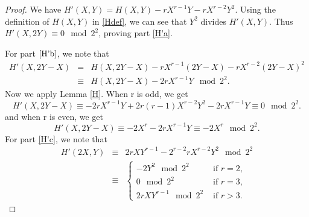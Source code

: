 \documentclass[11pt, reqno]{amsart}
\numberwithin{equation}{section}
\theoremstyle{definition}
\theoremstyle{remark}
\theoremstyle{definition}
\theoremstyle{remark}
\theoremstyle{remark}
\begin{document}
\begin{proof}
We have $H'(X,Y)= H(X,Y) -rX^{r-1}Y -rX^{r-2}Y^{2}$. 
 Using the definition of $H(X,Y)$ in \eqref{Hdef}, we can see that $Y^2$ divides $H'(X,Y)$. Thus $H'(X,2Y) \equiv 0\mod 2^2$, proving part \ref{H'a}.
 
  For part $\ref{H'b}$, we note that 
  \begin{eqnarray*}
   H'(X,2Y-X) &=& H(X,2Y-X)- rX^{r-1}(2Y-X) - rX^{r-2}(2Y-X)^{2}\\
   &\equiv & H(X,2Y-X) -2rX^{r-1}Y \mod 2^2.
 \end{eqnarray*} 
Now we apply Lemma \ref{H}. When r is odd, we get
 \begin{equation*}
   H'(X,2Y-X) \equiv  -2rX^{r-1}Y + 2r(r-1)X^{r-2}Y^{2}-2rX^{r-1}Y \equiv 0 \mod 2^{2}.
   \end{equation*}
   and when r is even, we get
   \begin{equation*}
     H'(X,2Y-X) \equiv  -2X^{r} -2rX^{r-1}Y 
     \equiv  -2X^{r} \mod 2^{2}.   
   \end{equation*}
   For part \ref{H'c}, we note that 
   \begin{eqnarray*}
   H'(2X,Y) &\equiv & 2rXY^{r-1} -2^{r-2}rX^{r-2}Y^2\mod 2^2\\
   & \equiv & \begin{cases}
   -2Y^2 \mod 2^2 & \text{ if }r=2,\\
    0  \mod 2^{2} & \text{ if } r=3,\\
    2rXY^{r-1} \mod 2^{2} & \text{ if }r>3.
    \end{cases} 
   \end{eqnarray*}
\end{proof}
\end{document}
